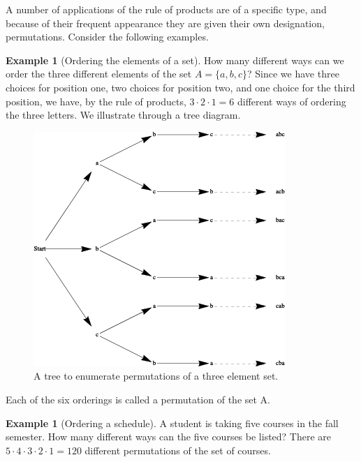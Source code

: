 \documentclass[10pt,]{book}
\theoremstyle{plain}
\theoremstyle{definition}
\theoremstyle{definition}
\newtheorem{example}[theorem]{Example}
\theoremstyle{definition}
\begin{document}
 A number of applications of the rule of products are of a specific type, and because of their frequent appearance they are given their own designation, permutations. Consider the following examples.
%
\begin{example}[Ordering the elements of a set]\label{ordering_a_set}
How many different ways can we order the three different elements of the set \(A = \{a, b, c\}\)? Since we have three choices for position one, two choices for position two, and one choice for the third position, we have, by the rule of products, \(3 \cdot 2 \cdot 1 = 6\) different ways of ordering the three letters. We illustrate through a tree diagram.%
\leavevmode%
\begin{figure}
\centering
\includegraphics[width=1\linewidth]{images/tree-of-permutations.png}
\caption{A tree to enumerate permutations of a three element set.
                \label{tree-of-permutations}}
\end{figure}
\par

 Each of the six orderings is called a permutation of the set A.
%
\end{example}
\begin{example}[Ordering a schedule]\label{ordering_a_schedule}
A student is taking five courses in the fall semester. How many different ways can the five courses be listed? There are \(5 \cdot 4 \cdot 3 \cdot 2 \cdot 1 = 120\) different permutations of the set of courses.%
\end{example}
\end{document}
